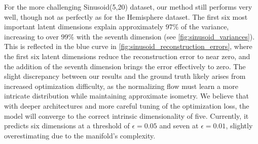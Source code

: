     For the more challenging Sinusoid(5,20) dataset, our method still performs very well, though not as perfectly as for the Hemisphere dataset. The first six most important latent dimensions explain approximately $97\%$ of the variance, increasing to over $99\%$ with the seventh dimension (see \ref{fig:sinusoid_variances}). This is reflected in the blue curve in \ref{fig:sinusoid_reconstruction_errors}, where the first six latent dimensions reduce the reconstruction error to near zero, and the addition of the seventh dimension brings the error effectively to zero. The slight discrepancy between our results and the ground truth likely arises from increased optimization difficulty, as the normalizing flow must learn a more intricate distribution while maintaining approximate isometry. We believe that with deeper architectures and more careful tuning of the optimization loss, the model will converge to the correct intrinsic dimensionality of five. Currently, it predicts six dimensions at a threshold of $\epsilon = 0.05$ and seven at $\epsilon = 0.01$, slightly overestimating due to the manifold's complexity.
    
